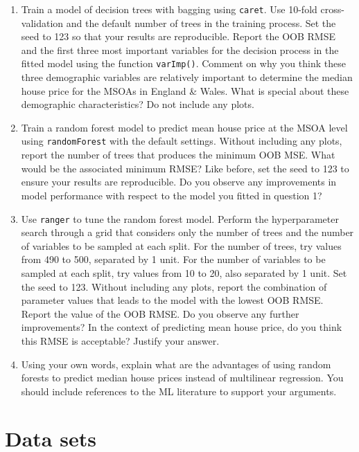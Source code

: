 \documentclass[
  letterpaper,
  DIV=11,
  numbers=noendperiod]{scrreprt}
\providecommand{\tightlist}{%
  \setlength{\itemsep}{0pt}\setlength{\parskip}{0pt}}\usepackage{longtable,booktabs,array}
\begin{document}
\begin{enumerate}
\def\labelenumi{\arabic{enumi}.}
\tightlist
\item
  Train a model of decision trees with bagging using \texttt{caret}. Use
  10-fold cross-validation and the default number of trees in the
  training process. Set the seed to 123 so that your results are
  reproducible. Report the OOB RMSE and the first three most important
  variables for the decision process in the fitted model using the
  function \texttt{varImp()}. Comment on why you think these three
  demographic variables are relatively important to determine the median
  house price for the MSOAs in England \& Wales. What is special about
  these demographic characteristics? Do not include any plots.
\item
  Train a random forest model to predict mean house price at the MSOA
  level using \texttt{randomForest} with the default settings. Without
  including any plots, report the number of trees that produces the
  minimum OOB MSE. What would be the associated minimum RMSE? Like
  before, set the seed to 123 to ensure your results are reproducible.
  Do you observe any improvements in model performance with respect to
  the model you fitted in question 1?
\item
  Use \texttt{ranger} to tune the random forest model. Perform the
  hyperparameter search through a grid that considers only the number of
  trees and the number of variables to be sampled at each split. For the
  number of trees, try values from 490 to 500, separated by 1 unit. For
  the number of variables to be sampled at each split, try values from
  10 to 20, also separated by 1 unit. Set the seed to 123. Without
  including any plots, report the combination of parameter values that
  leads to the model with the lowest OOB RMSE. Report the value of the
  OOB RMSE. Do you observe any further improvements? In the context of
  predicting mean house price, do you think this RMSE is acceptable?
  Justify your answer.
\item
  Using your own words, explain what are the advantages of using random
  forests to predict median house prices instead of multilinear
  regression. You should include references to the ML literature to
  support your arguments.
\end{enumerate}


\hypertarget{sec-chp11}{%
\chapter{Data sets}\label{sec-chp11}}
\end{document}
